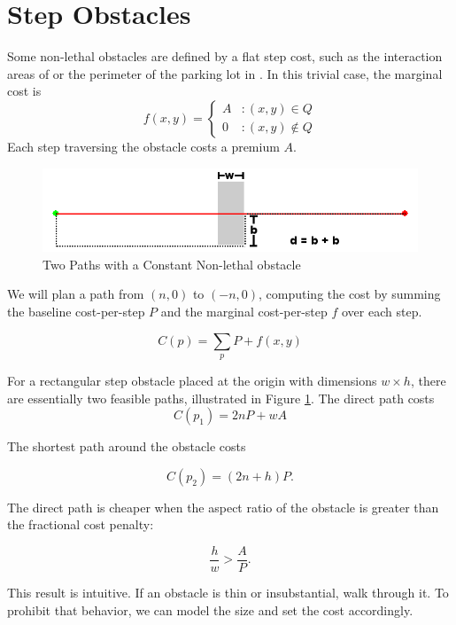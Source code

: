 \section{Step Obstacles}
Some non-lethal obstacles are defined by a flat step cost, such as the interaction areas of \citet{fraichard:anthronav} or the perimeter of the parking lot in \citet{likhachev:costmaps}. In this trivial case, the marginal cost is
\begin{equation}
   \displaystyle
   f(x, y) = \left\{
     \begin{array}{lr}
       A & : (x,y) \in Q\\
       0 & : (x,y) \notin Q
     \end{array}
   \right.
\end{equation}
Each step traversing the obstacle costs a premium $A$. 

\begin{figure}[!t]
\includegraphics[width=\columnwidth]{graphix/Constant.png}
\caption{Two Paths with a Constant Non-lethal obstacle}
\label{fig:constant}
\end{figure}

We will plan a path from $(n, 0)$ to $(-n, 0)$, computing the cost by summing the baseline cost-per-step $P$ and the marginal cost-per-step $f$ over each step.

\begin{equation}
C(p) = \sum\limits_p P + f(x, y)
\end{equation}

For a rectangular step obstacle placed at the origin with dimensions $w\times h$, there are essentially two feasible paths, illustrated in Figure \ref{fig:constant}. The direct path costs
\begin{equation}
C(p_1) = 2nP + wA
\end{equation}

The shortest path around the obstacle costs

\begin{equation}
C(p_2) = (2n + h)P.
\end{equation}

The direct path is cheaper when the aspect ratio of the obstacle  is greater than the fractional cost penalty:

\begin{equation}
\frac{h}{w} > \frac{A}{P}.
\end{equation}

This result is intuitive. If an obstacle is thin or insubstantial, walk through it. To prohibit that behavior, we can model the size and set the cost accordingly.




